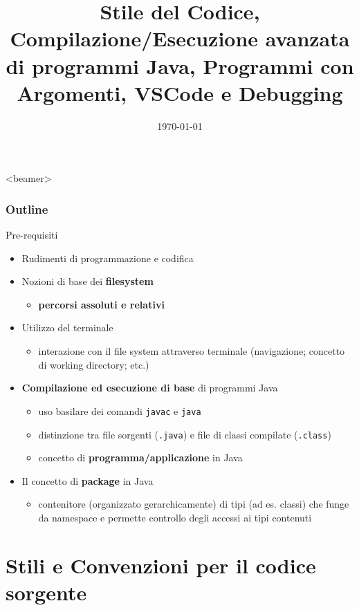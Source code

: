 \documentclass[xcolor=dvipsnames,presentation]{beamer}
\title[{\lab} -- Strumenti Avanzati]{Stile del Codice, Compilazione/Esecuzione avanzata di programmi Java, Programmi con Argomenti, VSCode e Debugging}
\date[\today]{\today}
\begin{document}
\frame[label=coverpage]{\titlepage}

\begin{frame}<beamer>
    \frametitle{Outline}
    \tableofcontents[]
\end{frame}

\begin{frame}{Pre-requisiti}
\begin{itemize}
\item Rudimenti di programmazione e codifica
\item Nozioni di base dei \textbf{filesystem}
    \begin{itemize}
    \item \textbf{percorsi assoluti e relativi}
    \end{itemize}
\item Utilizzo del terminale
    \begin{itemize}
    \item interazione con il file system attraverso terminale (navigazione; concetto di working directory; etc.)
    \end{itemize}
\item \textbf{Compilazione ed esecuzione di base} di programmi Java
    \begin{itemize}
    \item uso basilare dei comandi \texttt{javac} e \texttt{java}
    \item distinzione tra file sorgenti (\texttt{.java}) e file di classi compilate (\texttt{.class})
    \item concetto di \textbf{programma/applicazione} in Java
    \end{itemize}
\item Il concetto di \textbf{package} in Java
    \begin{itemize}
    \item contenitore (organizzato gerarchicamente) di tipi (ad es. classi) che funge da namespace e permette controllo degli accessi ai tipi contenuti
    \end{itemize}
\end{itemize}
\end{frame}

\section{Stili e Convenzioni per il codice sorgente}
\end{document}
